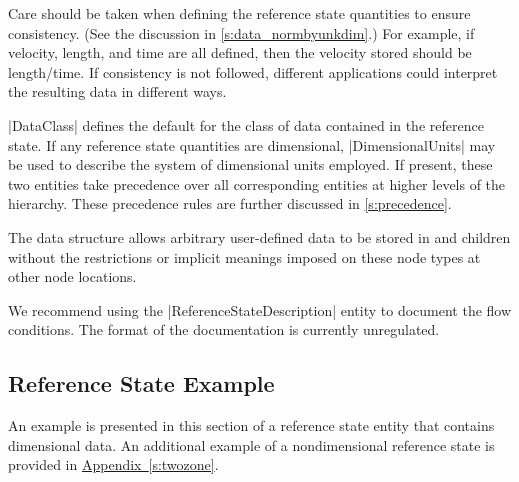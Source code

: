 Care should be taken when defining the reference state quantities to
ensure consistency.
(See the discussion in \autoref{s:data_normbyunkdim}.)
For example, if velocity, length, and time are all defined, then the
velocity stored should be length/time.
If consistency is not followed, different applications could interpret
the resulting data in different ways.

|DataClass| defines the default for the class of data contained in the
reference state.
If any reference state quantities are dimensional, |DimensionalUnits|
may be used to describe the system of dimensional units employed.
If present, these two entities take precedence over all corresponding
entities at higher levels of the hierarchy.
These precedence rules are further discussed in \autoref{s:precedence}.

The  data structure allows arbitrary
user-defined data to be stored in  and
 children without the restrictions or implicit
meanings imposed on these node types at other node locations.

We recommend using the |ReferenceStateDescription| entity to document
the flow conditions.  The format of the documentation is currently
unregulated.

\subsection{Reference State Example}

An example is presented in this section of a reference state entity that
contains dimensional data.
An additional example of a nondimensional reference state is provided in
\hyperref[s:twozone]{Appendix~\ref*{s:twozone}}.

